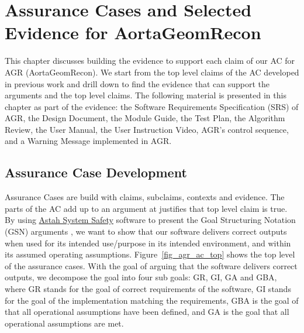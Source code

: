 \chapter{Assurance Cases and Selected Evidence for AortaGeomRecon}

This chapter discusses building the evidence to support each claim of our AC  for AGR (AortaGeomRecon). We start from the top level claims of the AC developed in previous work \cite{scs_ac} and drill down to find the evidence that can support the arguments and the top level claims. The following material is presented in this chapter as part of the evidence: the Software Requirements Specification (SRS) of AGR, the Design Document, the Module Guide, the Test Plan, the Algorithm Review,  the User Manual, the User Instruction Video, AGR's control sequence, and a Warning Message implemented in AGR.

\section{Assurance Case Development}

Assurance Cases are build with claims, subclaims, contexts and evidence. The parts of  the AC  add up  to an argument at justifies that top level claim is true. By using \href{https://astah.net/products/astah-system-safety/}{Astah System Safety} software to present the Goal Structuring Notation (GSN) arguments \cite{Astah_2023}\cite{kelly2004goal}, we want to show that our software delivers correct outputs when used for its intended use/purpose in its intended environment, and within its assumed operating assumptions. Figure~\ref{fig_agr_ac_top} shows the top level of the assurance cases. With the goal of arguing that the software delivers correct outputs, we decompose the goal into four sub goals: GR, GI, GA and GBA, where GR stands for the goal of correct requirements of the software, GI stands for the goal of the implementation  matching the requirements, GBA is the goal of  that all  operational assumptions have been defined, and GA is the goal that all operational assumptions are met.

